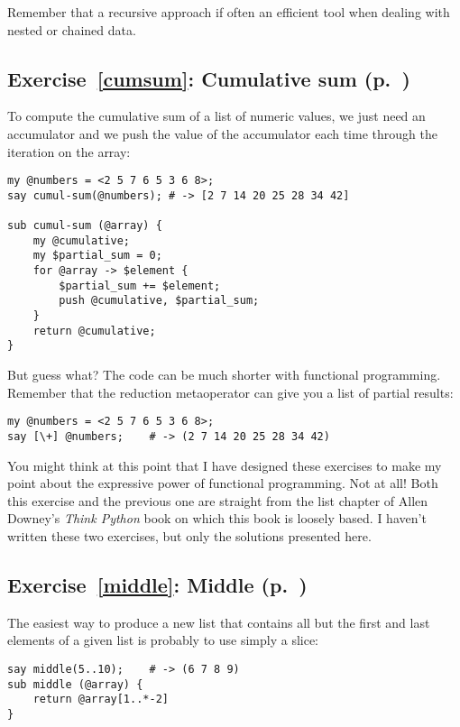 Remember that a recursive approach if often an efficient 
tool when dealing with nested or chained data. 

\subsection{Exercise~\ref{cumsum}: Cumulative sum (p.~\pageref{cumsum})}
\label{sol_cumsum}

To compute the cumulative sum of a list of numeric values, 
we just need an accumulator and we push the value of 
the accumulator each time through the iteration 
on the array:

\begin{verbatim}
my @numbers = <2 5 7 6 5 3 6 8>;
say cumul-sum(@numbers); # -> [2 7 14 20 25 28 34 42]

sub cumul-sum (@array) {
    my @cumulative;
    my $partial_sum = 0;
    for @array -> $element {
        $partial_sum += $element;
        push @cumulative, $partial_sum;
    }
    return @cumulative;
}
\end{verbatim}

But guess what? The code can be much shorter with 
functional programming. Remember that the reduction 
metaoperator can give you a list of partial results:

\begin{verbatim}
my @numbers = <2 5 7 6 5 3 6 8>;
say [\+] @numbers;    # -> (2 7 14 20 25 28 34 42)
\end{verbatim}

You might think at this point that I have designed these 
exercises to make my point about the expressive power 
of functional programming. Not at all! Both this 
exercise and the previous one are straight from 
the list chapter of Allen Downey's \emph{Think Python} 
book on which this book is loosely based. 
I haven't written these two exercises, but only the 
solutions presented here.


\subsection{Exercise~\ref{middle}: Middle (p.~\pageref{middle})}
\label{sol_middle}

The easiest way to produce a new list that contains 
all but the first and last elements of a given list 
is probably to use simply a slice:

\begin{verbatim}
say middle(5..10);    # -> (6 7 8 9)
sub middle (@array) { 
    return @array[1..*-2] 
}
\end{verbatim}

